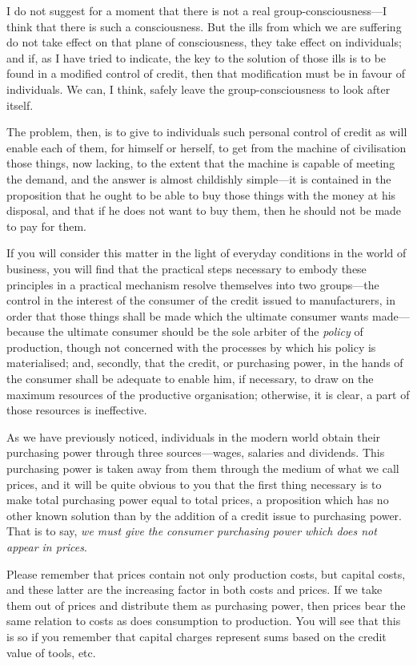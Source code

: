 \documentclass{book}
\begin{document}
I do not suggest for a moment that there is not a real group-consciousness—I think that there is such a consciousness. But the ills from which we are suffering do not take effect on that plane of consciousness, they take effect on individuals; and if, as I have tried to indicate, the key to the solution of those ills is to be found in a modified control of credit, then that modification must be in favour of individuals. We can, I think, safely leave the group-consciousness to look after itself.

The problem, then, is to give to individuals such personal control of credit as will enable each of them, for himself or herself, to get from the machine of civilisation those things, now lacking, to the extent that the machine is capable of meeting the demand, and the answer is almost childishly simple—it is contained in the proposition that he ought to be able to buy those things with the money at his disposal, and that if he does not want to buy them, then he should not be made to pay for them.

If you will consider this matter in the light of everyday conditions in the world of business, you will find that the practical steps necessary to embody these principles in a practical mechanism resolve themselves into two groups—the control in the interest of the consumer of the credit issued to manufacturers, in order that those things shall be made which the ultimate consumer wants made—because the ultimate consumer should be the sole arbiter of the \emph{policy} of production, though not concerned with the processes by which his policy is materialised; and, secondly, that the credit, or purchasing power, in the hands of the consumer shall be adequate to enable him, if necessary, to draw on the maximum resources of the productive organisation; otherwise, it is clear, a part of those resources is ineffective.

As we have previously noticed, individuals in the modern world obtain their purchasing power through three sources—wages, salaries and dividends. This purchasing power is taken away from them through the medium of what we call prices, and it will be quite obvious to you that the first thing necessary is to make total purchasing power equal to total prices, a proposition which has no other known solution than by the addition of a credit issue to purchasing power. That is to say, \emph{we must give the consumer purchasing power which does not appear in prices}.

Please remember that prices contain not only production costs, but capital costs, and these latter are the increasing factor in both costs and prices. If we take them out of prices and distribute them as purchasing power, then prices bear the same relation to costs as does consumption to production. You will see that this is so if you remember that capital charges represent sums based on the credit value of tools, etc.
\end{document}
